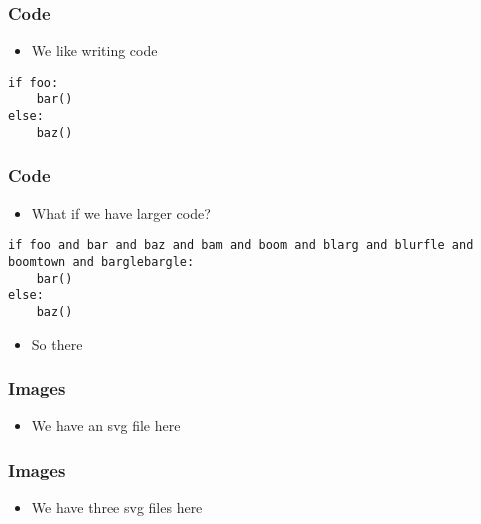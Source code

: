 \documentclass[aspectratio=169]{beamer}
\begin{document}
\begin{frame}[fragile]
\frametitle{ Code }
\begin{itemize}
    \item 
        We like writing code
\end{itemize}
\begin{tcolorbox}[colback=white,colframe=black]%
\fontsize{5.5pt}{6.050000000000001pt}\selectfont
\begin{verbatim}
if foo:
    bar()
else:
    baz()
\end{verbatim}
\end{tcolorbox}
\end{frame}
\begin{frame}[fragile]
\frametitle{ Code }
\begin{itemize}
    \item 
        What if we have larger code?
\end{itemize}
\begin{tcolorbox}[colback=white,colframe=black]%
\fontsize{11.0pt}{12.100000000000001pt}\selectfont
\begin{verbatim}
if foo and bar and baz and bam and boom and blarg and blurfle and boomtown and barglebargle:
    bar()
else:
    baz()
\end{verbatim}
\end{tcolorbox}
\begin{itemize}
    \item 
        So there
\end{itemize}
\end{frame}
\begin{frame}
\frametitle{ Images }
\begin{itemize}
    \item 
        We have an svg file here
\end{itemize}
\begin{center}

\end{center}
\end{frame}
\begin{frame}
\frametitle{ Images }
\begin{itemize}
    \item 
        We have three svg files here
\end{itemize}
\begin{center}



\end{center}
\end{frame}
\end{document}
